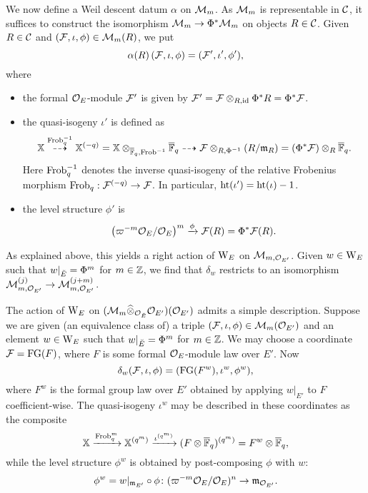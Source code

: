 \documentclass[../main.tex]{subfiles}
\begin{document}
We now define a Weil descent datum $\alpha$ on $\mathcal{M}_m$. As $\mathcal{M}_m$ is representable
in $\mathcal{C}$, it suffices to construct the isomorphism
$\mathcal{M}_m \to \Phi^* \mathcal{M}_m$ on objects $R \in \mathcal{C}$. 
Given $R\in \mathcal{C}$ and $(\mathcal{F}, \iota, \phi) \in \mathcal{M}_m(R)$, we put
\begin{equation*}
  \alpha(R) \left( \mathcal{F}, \iota, \phi \right) = (\mathcal{F}', \iota',\phi'),
\end{equation*}
where
\begin{itemize}
  \item the formal $\mathcal{O}_E$-module $\mathcal{F}'$ is given by $\mathcal{F}' = \mathcal{F} \otimes_{R, \operatorname{id}}
    \Phi^* R = \Phi^* \mathcal{F}$.
  \item the quasi-isogeny $\iota'$ is defined as
    \begin{equation*}
      \mathbb{X} \overset{\mathrm{Frob}_q^{-1}}{\dashrightarrow} \mathbb{X}^{(-q)} = \mathbb{X}
      \otimes_{\overline {\mathbb{F}}_q, \mathrm{Frob}^{-1}}
      {\overline {\mathbb{F}}_q} \dashrightarrow \mathcal{F} \otimes_{R, \Phi^{-1}} (R/\mathfrak{m}_R) = (\Phi^*
      \mathcal{F}) \otimes_R {\overline {\mathbb{F}}_q}.
    \end{equation*}
    Here $\mathrm{Frob}_q^{-1}$ denotes the inverse quasi-isogeny of the relative
    Frobenius morphism $\mathrm{Frob}_q: \mathcal{F}^{(-q)} \to \mathcal{F}$. In particular, 
    $\textnormal{ht}(\iota') = \textnormal{ht}(\iota)-1$.
  \item the level structure $\phi'$ is
    \begin{equation*}
      \left({\varpi^{-m}\mathcal{O}_E}/{\mathcal{O}_E} \right)^m      
       \xrightarrow{\phi} \mathcal{F}(R) = \Phi^* \mathcal{F}(R).
    \end{equation*}
\end{itemize}

As explained above, this yields a right action of $\mathrm W_E$ on $\mathcal{M}_{m, \mathcal{O}_{{E'}}}$.
Given $w \in \mathrm W_E$ such that $w|_{\breve {E}} = \Phi^m$ for $m \in \mathbb{Z}$, we find
that $\delta_w$ restricts to an isomorphism $\mathcal{M}_{m, \mathcal{O}_{{E'}}}^{(j)} \to \mathcal{M}_{m,
\mathcal{O}_{{E'}}}^{(j+m)}$. 

\begin{xpl}
  The action of $\mathrm W_E$ on 
  $(\mathcal{M}_{m}\widehat \otimes_{\mathcal{O}_{\breve {E}}} \mathcal{O}_{E'})({\mathcal{O}_{E'}})$ admits a simple description.
  Suppose we are given (an equivalence class of)
  a triple $(\mathcal{F}, \iota, \phi) \in \mathcal{M}_m({\mathcal{O}_{E'}})$ 
  and an element $w \in \mathrm W_E$ such that 
  $w|_{{\breve {E}}} = \Phi^m$ for $m \in \mathbb{Z}$. We may choose a coordinate
  $\mathcal{F} = \textnormal{FG}(F)$, where $F$ is some formal $\mathcal{O}_E$-module law over $E'$. Now
  $$\delta_w(\mathcal{F}, \iota, \phi) = (\textnormal{FG}(F^w), \iota^w, \phi^w),$$ 
  where $F^w$ is the formal group law over $E'$ obtained by applying 
  $w|_{E'}$ to $F$ coefficient-wise. The quasi-isogeny $\iota^w$ may be
  described in these coordinates as the composite
  $$ \mathbb{X} \xrightarrow{\mathrm{Frob}_q^m} \mathbb{X}^{(q^m)} \xrightarrow{\iota^{(q^m)}} (F \otimes
  {\overline{\mathbb{F}}_q})^{(q^m)} = F^w \otimes {\overline{\mathbb{F}}_q},$$
  while the level structure $\phi^w$ is obtained by post-composing $\phi$ with $w$:
  $$\phi^w = w|_{\mathfrak{m}_{E'}} \circ \phi \colon (\varpi^{-m}\mathcal{O}_E/\mathcal{O}_E)^n 
  \to \mathfrak{m}_{\mathcal{O}_{E'}}.$$
\end{xpl}
\end{document}
